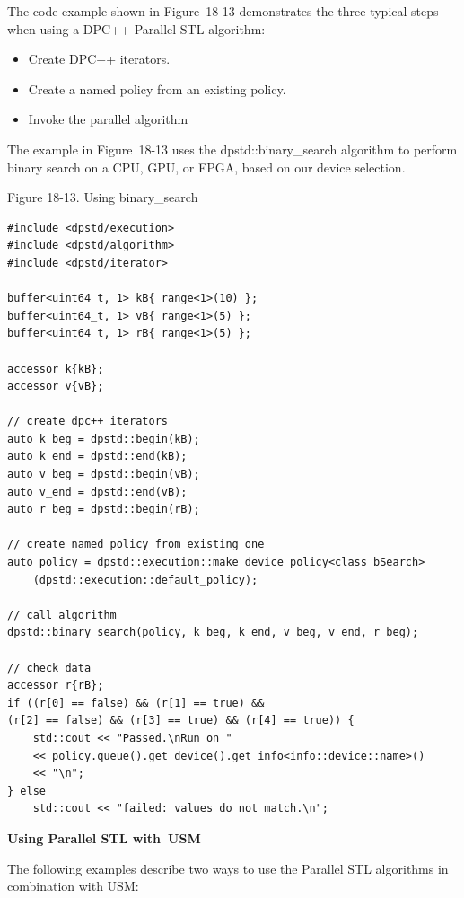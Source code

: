 The code example shown in Figure 18-13 demonstrates the three typical steps when using a DPC++ Parallel STL algorithm:\par

\begin{itemize}
	\item Create DPC++ iterators.
	\item Create a named policy from an existing policy.
	\item Invoke the parallel algorithm
\end{itemize}

The example in Figure 18-13 uses the dpstd::binary\_search algorithm to perform binary search on a CPU, GPU, or FPGA, based on our device selection.\par

\hspace*{\fill} \par %
Figure 18-13. Using binary\_search
\begin{lstlisting}[caption={}]
#include <dpstd/execution>
#include <dpstd/algorithm>
#include <dpstd/iterator>

buffer<uint64_t, 1> kB{ range<1>(10) };
buffer<uint64_t, 1> vB{ range<1>(5) };
buffer<uint64_t, 1> rB{ range<1>(5) };

accessor k{kB};
accessor v{vB};

// create dpc++ iterators
auto k_beg = dpstd::begin(kB);
auto k_end = dpstd::end(kB);
auto v_beg = dpstd::begin(vB);
auto v_end = dpstd::end(vB);
auto r_beg = dpstd::begin(rB);

// create named policy from existing one
auto policy = dpstd::execution::make_device_policy<class bSearch>
	(dpstd::execution::default_policy);

// call algorithm
dpstd::binary_search(policy, k_beg, k_end, v_beg, v_end, r_beg);

// check data
accessor r{rB};
if ((r[0] == false) && (r[1] == true) && 
(r[2] == false) && (r[3] == true) && (r[4] == true)) {
	std::cout << "Passed.\nRun on "
	<< policy.queue().get_device().get_info<info::device::name>()
	<< "\n";
} else
	std::cout << "failed: values do not match.\n";
\end{lstlisting}

\hspace*{\fill} \par %
\textbf{Using Parallel STL with USM}

The following examples describe two ways to use the Parallel STL algorithms in combination with USM:\par

